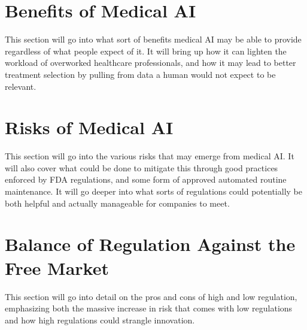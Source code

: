 \documentclass[]{article}
\begin{document}
	\section{Benefits of Medical AI}
		This section will go into what sort of benefits medical AI may be able to provide regardless of what people expect of it. It will bring up how it can lighten the workload of overworked healthcare professionals, and how it may lead to better treatment selection by pulling from data a human would not expect to be relevant.

	\section{Risks of Medical AI}
		This section will go into the various risks that may emerge from medical AI. It will also cover what could be done to mitigate this through good practices enforced by FDA regulations, and some form of approved automated routine maintenance. It will go deeper into what sorts of regulations could potentially be both helpful and actually manageable for companies to meet.

	\section{Balance of Regulation Against the Free Market}
		This section will go into detail on the pros and cons of high and low regulation, emphasizing both the massive increase in risk that comes with low regulations and how high regulations could strangle innovation.

\medskip



		
\end{document}
